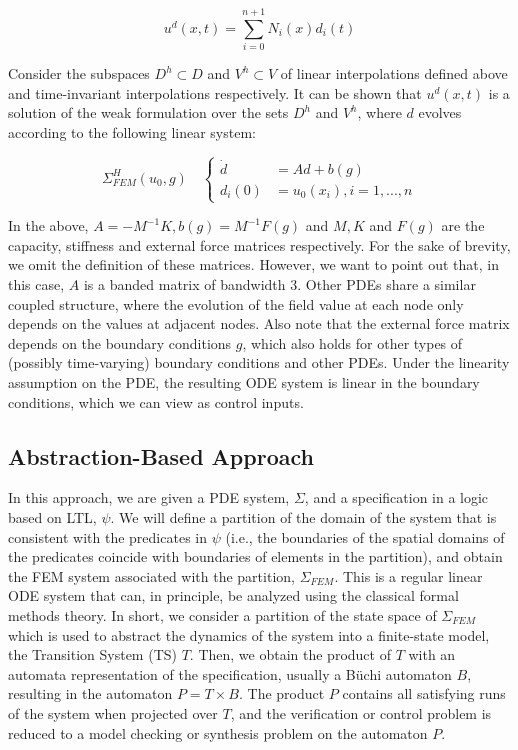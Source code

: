 \documentclass{article}
\begin{document}
\begin{equation}
    u^d(x, t) = \sum_{i=0}^{n+1} N_i(x) d_i(t)
\end{equation}

Consider the subspaces $D^h \subset D$ and $V^h \subset V$ of linear
interpolations defined above and time-invariant interpolations respectively.
It can be shown that $u^d(x, t)$ is a solution of the weak formulation over the
sets $D^h$ and $V^h$, where $d$ evolves
according to the following linear system:

\begin{equation}\label{eq:fem}
    \Sigma^H_{FEM}(u_0, g) \quad \left \{
    \begin{aligned}
        \dot{d} &= A d + b(g) \\
        d_i(0) &= u_0(x_i), i = 1,...,n
    \end{aligned}
    \right.
\end{equation}

In the above, $A = -M^{-1}K, b(g) = M^{-1} F(g)$ and $M, K$ and $F(g)$ are the capacity,
stiffness and external force matrices respectively. For the sake of brevity, 
we omit the definition of these matrices. However, we want to point out that,
in this case, $A$ is a banded matrix of bandwidth 3. Other PDEs share a similar
coupled structure, where the evolution of the field value at each node only
depends on the values at adjacent nodes. Also note that the external force
matrix depends on the boundary conditions $g$, which also holds for other types
of (possibly time-varying) boundary conditions and other PDEs. Under the
linearity assumption on the PDE, the resulting ODE system is linear in the
boundary conditions, which we can view as control inputs.

\subsection{Abstraction-Based Approach}
\label{sub:abstraction_based_approach}

In this approach, we are given a PDE system, $\Sigma$, and a specification in a logic based on
LTL, $\psi$. We will define a partition of the domain of the system that is
consistent with the predicates in $\psi$ (i.e., the boundaries of the spatial
domains of the predicates coincide with boundaries of elements in the
partition), and obtain the FEM system associated with the partition,
$\Sigma_{FEM}$. This is a regular linear ODE system that can, in principle, be
analyzed using the classical formal methods theory. In short, we consider a partition of the
state space of $\Sigma_{FEM}$ which is used to abstract the dynamics of the
system into a finite-state model, the Transition System (TS) $T$. Then, we obtain the
product of $T$ with an automata representation of the specification, usually a
Büchi automaton $B$, resulting in the automaton $P = T \times B$. The product $P$ contains all
satisfying runs of the system when projected over $T$, and the verification or
control problem is reduced to a model checking or synthesis problem on the automaton $P$.
\end{document}
